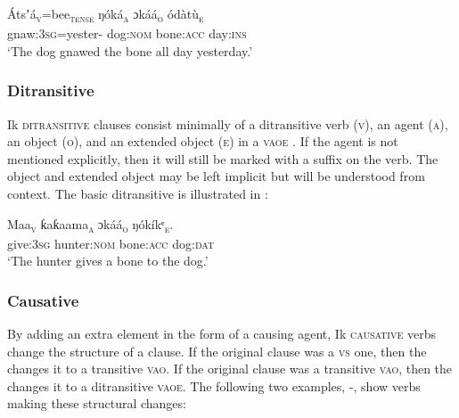 \ea\label{ex:syn:14}
\gll Átsʼá\textsc{\textsubscript{v}}=bee\textsc{\textsubscript{tense}}   ŋóká\textsc{\textsubscript{a}}     ɔkáá\textsc{\textsubscript{o}}         ódàtù\textsc{\textsubscript{e}} \\
gnaw:\textsc{3sg}=yester-  dog:\textsc{nom}  bone:\textsc{acc}  day:\textsc{ins}    \\
\glt ‘The dog gnawed the bone all day yesterday.’ 
\z




\subsubsection{Ditransitive}\label{sec:10.2.3}

Ik \textsc{ditransitive} clauses consist minimally of a ditransitive verb (\textsc{v}), an agent (\textsc{a}), an object (\textsc{o}), and an extended object (\textsc{e}) in a \textsc{vaoe} . If the agent is not mentioned explicitly, then it will still be marked with a suffix on the verb. The object and extended object may be left implicit but will be understood from context. The basic ditransitive  is illustrated in :




\ea\label{ex:syn:15}
\gll Maa\textsc{\textsubscript{v}}     ƙaƙaama\textsc{\textsubscript{a}}   ɔkáá\textsc{\textsubscript{o}}     ŋókíkᵉ\textsc{\textsubscript{e}}. \\
give:\textsc{3sg}   hunter:\textsc{nom}   bone:\textsc{acc}   dog:\textsc{dat}    \\
\glt ‘The hunter gives a bone to the dog.’ 
\z




\subsubsection{Causative}\label{sec:10.2.4}

By adding an extra element in the form of a causing agent, Ik \textsc{causative} verbs change the structure of a clause. If the original clause was a \textsc{vs}  one, then the  changes it to a transitive \textsc{vao}. If the original clause was a transitive \textsc{vao}, then the  changes it to a ditransitive \textsc{vaoe}. The following two examples, -, show  verbs making these structural changes:\\




